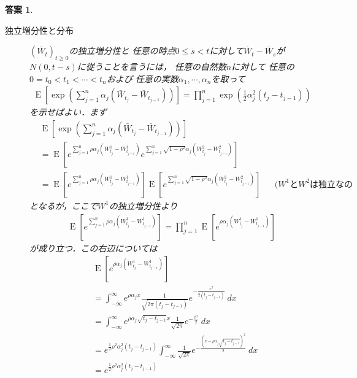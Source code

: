 \documentclass[11pt,a4paper]{jsarticle}
\theoremstyle{mystyle}
\newtheorem*{ans}{答案}
\begin{document}
\begin{ans}
\begin{description}
		\item[独立増分性と分布]
			$(\bar{W}_{t})_{t \geq 0}$の独立増分性と
			任意の時点$0 \leq s < t$に対して$\bar{W}_{t} - \bar{W}_{s}$が
			$N(0,t-s)$に従うことを言うには，
			任意の自然数$n$に対して
			任意の$0 = t_{0} < t_{1} < \cdots < t_{n}$および
			任意の実数$\alpha_{1},\cdots,\alpha_{n}$を取って
			\begin{align}
				\operatorname{E}\left[\exp{\left(\sum_{j=1}^{n}\alpha_{j}(\bar{W}_{t_{j}} - \bar{W}_{t_{j-1}})\right)}\right]
				= \prod_{j=1}^{n} \exp{\left(\frac{1}{2}\alpha_{j}^{2}(t_{j}-t_{j-1})\right)}
			\end{align}
			を示せばよい．まず
			\begin{align}
				&\operatorname{E}\left[\exp{\left(\sum_{j=1}^{n}\alpha_{j}(\bar{W}_{t_{j}} - \bar{W}_{t_{j-1}})\right)}\right] \\
				&= \operatorname{E}\left[e^{\sum_{j=1}^{n}\rho\alpha_{j}(W^{1}_{t_{j}} - W^{1}_{t_{j-1}})}e^{\sum_{j=1}^{n}\sqrt{1-\rho^{2}}\alpha_{j}(W^{2}_{t_{j}} - W^{2}_{t_{j-1}})}\right] \\
				&=  \operatorname{E}\left[e^{\sum_{j=1}^{n}\rho\alpha_{j}(W^{1}_{t_{j}} - W^{1}_{t_{j-1}})}\right] \operatorname{E}\left[e^{\sum_{j=1}^{n}\sqrt{1-\rho^{2}}\alpha_{j}(W^{2}_{t_{j}} - W^{2}_{t_{j-1}})}\right] && \mbox{($W^{1}$と$W^{2}$は独立なので)}
			\end{align}
			となるが，ここで$W^{1}$の独立増分性より
			\begin{align}
				\operatorname{E}\left[e^{\sum_{j=1}^{n}\rho\alpha_{j}(W^{1}_{t_{j}} - W^{1}_{t_{j-1}})}\right] 
				= \prod_{j=1}^{n} \operatorname{E}\left[e^{\rho\alpha_{j}(W^{1}_{t_{j}} - W^{1}_{t_{j-1}})}\right]
			\end{align}
			が成り立つ．この右辺については
			\begin{align}
				&\operatorname{E}\left[e^{\rho\alpha_{j}(W^{1}_{t_{j}} - W^{1}_{t_{j-1}})}\right] \\
				&= \int_{-\infty}^{\infty} e^{\rho\alpha_{j}x}\frac{1}{\sqrt{2\pi(t_{j}-t_{j-1})}}e^{-\frac{x^{2}}{2(t_{j}-t_{j-1})}}\ dx \\
				&= \int_{-\infty}^{\infty} e^{\rho\alpha_{j}\sqrt{t_{j}-t_{j-1}}x}\frac{1}{\sqrt{2\pi}}e^{-\frac{x^{2}}{2}}\ dx \\
				&= e^{\frac{1}{2}\rho^{2}\alpha_{j}^{2}(t_{j}-t_{j-1})}\int_{-\infty}^{\infty} \frac{1}{\sqrt{2\pi}}e^{-\frac{(x-\rho\alpha_{j}\sqrt{t_{j}-t_{j-1}})^{2}}{2}}\ dx \\
				&= e^{\frac{1}{2}\rho^{2}\alpha_{j}^{2}(t_{j}-t_{j-1})}
			\end{align}

\end{description}
\end{ans}
\end{document}
